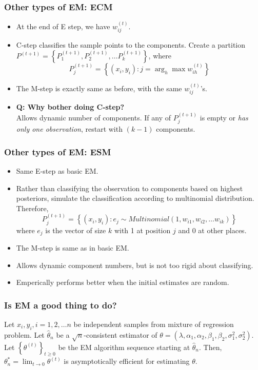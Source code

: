 \documentclass{beamer}
\begin{document}
\begin{frame}
	\frametitle{Other types of EM: ECM}
	\begin{itemize}
		\item At the end of E step, we have $w_{ij}^{(t)}$.
		\item C-step classifies the sample points to the components. Create a partition $P^{(t+1)} = \left\{ P_1^{(t+1)}, P_2^{(t+1)}, \dots P_k^{(t+1)} \right\}$, where
		$$P_j^{(t+1)} = \left\{ (x_i, y_i) : j = \arg_h\max w_{ih}^{(t)} \right\}$$
		\item The M-step is exactly same as before, with the same $w_{ij}^{(t)}$'s.
		\item \textbf{Q: Why bother doing C-step?}\\
		Allows dynamic number of components. If any of $P_j^{(t+1)}$ is empty or \textit{has only one observation}, restart with $(k-1)$ components.
		  
	\end{itemize}
\end{frame}


\begin{frame}
	\frametitle{Other types of EM: ESM}
	\begin{itemize}
		\item Same E-step as basic EM.
		\item Rather than classifying the observation to components based on highest posteriors, simulate the classification according to multinomial distribution. Therefore,
		$$P_j^{(t+1)} = \left\{ (x_i, y_i) : e_j \sim Multinomial(1, w_{i1}, w_{i2}, \dots w_{ik}) \right\}$$
		where $e_j$ is the vector of size $k$ with 1 at position $j$ and 0 at other places.
		\item The M-step is same as in basic EM.
		\item Allows dynamic component numbers, but is not too rigid about classifying.
		\item Emperically performs better when the initial estimates are random.
	\end{itemize}
\end{frame}

\begin{frame}
	\frametitle{Is EM a good thing to do?}
	\begin{theorem}[De Veaux, 1986]
		Let $x_i, y_i, i=1,2,\dots n$ be independent samples from mixture of regression problem. Let $\hat{\theta}_n$ be a $\sqrt{n}$-consistent estimator of $\theta = (\lambda, \alpha_1, \alpha_2,\beta_1,\beta_2,\sigma_1^2, \sigma_2^2)$. Let $\left\{ \theta^{(t)} \right\}_{t\geq 0}$ be the EM algorithm sequence starting at $\hat{\theta}_n$. Then, $\theta_n^* = \lim_{t\rightarrow 0}\theta^{(t)}$ is asymptotically efficient for estimating $\theta$.
	\end{theorem}
\end{frame}
\end{document}

